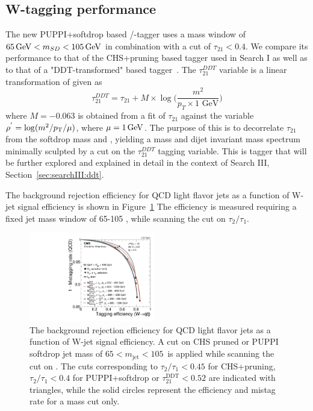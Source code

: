 \subsection{W-tagging performance}
The new PUPPI+softdrop based \PW/\PZ-tagger uses a mass window of $65 \,\text{Ge\hspace{-.08em}V} < m_{SD} < 105 \,\text{Ge\hspace{-.08em}V}$ in combination with a cut of $\tau_{21}<0.4$.
We compare its performance to that of the CHS+pruning based tagger used in Search I as well as to that of a "DDT-transformed" \nsubj based tagger~\cite{Dolen:2016kst}. The $\tau_{21}^{DDT}$ variable is a linear transformation of \nsubj given as
\begin{equation}
\tau_{21}^{DDT} = \tau_{21} + M \times \log \bigg( \frac{m^2}{p_T \times 1 \textrm{ GeV}}\bigg)
\end{equation}
where $M=-0.063$ is obtained from a fit of $\tau_{21}$ against the variable $\rho^{'}=\log(m^2/p_{\mathrm{T}}/\mu)$, where $\mu = 1 \,\text{Ge\hspace{-.08em}V}$.
The purpose of this is to decorrelate $\tau_{21}$ from the softdrop mass and \PT, yielding a mass and dijet invariant mass spectrum minimally sculpted by
a cut on the $\tau_{21}^{DDT}$ tagging variable. This is tagger that will be further explored and explained in detail in the context of Search III, Section~\ref{sec:searchIII:ddt}.\par
The background rejection efficiency for QCD light flavor jets as a function of W-jet signal efficiency is shown in Figure~\ref{fig:searchII:roc}
The efficiency is measured requiring a fixed jet mass window of 65-105 \GeV, while scanning the cut on $\tau_2/\tau_1$.

\begin{figure}[htbp]
\centering
\includegraphics[width=0.49\textwidth]{figures/vtagging/JME-16-003/BoostedW/roc_WqqvsQCD_2bins.pdf}
\caption{The background rejection efficiency for QCD light flavor jets as a function of W-jet signal efficiency. A cut on CHS pruned or PUPPI softdrop jet
mass of $65<m_{\mathrm{jet}}<105$~\GeV is applied while scanning the cut on \nsubj. The cuts corresponding to $\tau_2/\tau_1 < 0.45$ for CHS+pruning, $\tau_2/\tau_1 < 0.4$ for PUPPI+softdrop or $\tau_{21}^\text{DDT}<0.52$ are indicated with triangles, while the solid circles represent the efficiency and mistag rate for a mass cut only.
}
\label{fig:searchII:roc}
\end{figure}

